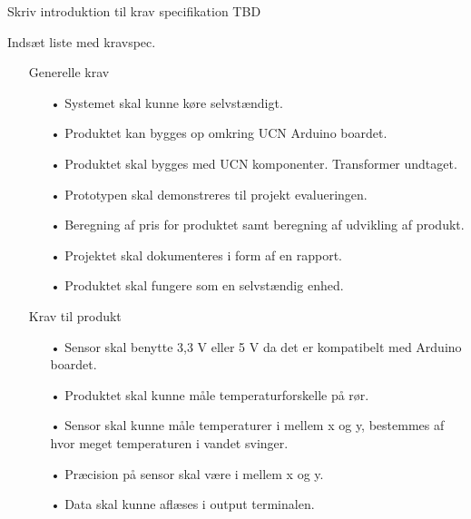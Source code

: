 Skriv introduktion til krav specifikation TBD

Indsæt liste med kravspec.
\begin{enumerate}
\item[]Generelle krav
\begin{enumerate}
	\item[•]Systemet skal kunne køre selvstændigt.
	\item[•]Produktet kan bygges op omkring UCN Arduino boardet. 
	\item[•]Produktet skal bygges med UCN komponenter. Transformer undtaget.
	\item[•]Prototypen skal demonstreres til projekt evalueringen. 
	\item[•]Beregning af pris for produktet samt beregning af udvikling af       produkt.
	\item[•]Projektet skal dokumenteres i form af en rapport.
	\item[•]Produktet skal fungere som en selvstændig enhed.
\end{enumerate}	

\item[]Krav til produkt
\begin{enumerate}
	\item[•]Sensor skal benytte 3,3 V eller 5 V da det er kompatibelt med Arduino boardet.
	\item[•]Produktet skal kunne måle temperaturforskelle på rør.
	\item[•]Sensor skal kunne måle temperaturer i mellem x og y, bestemmes af hvor meget temperaturen i vandet svinger.
	\item[•]Præcision på sensor skal være i mellem x og y.
	\item[•]Data skal kunne aflæses i output terminalen.
\end{enumerate}	
\end{enumerate}	